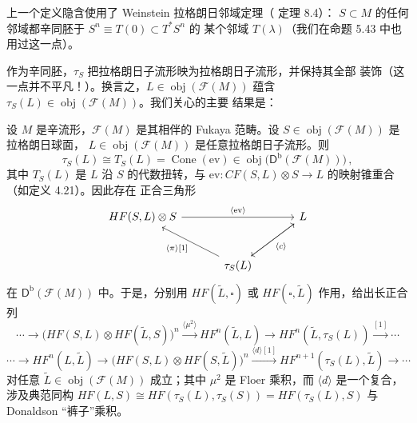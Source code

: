 
上一个定义隐含使用了 Weinstein 拉格朗日邻域定理（\cite{Sil12} 定理 8.4）：
$S\subset M$ 的任何邻域都辛同胚于 $S^n\equiv T(0)\subset T^*S^n$ 的
某个邻域 $T(\lambda)$（我们在命题 5.43 中也用过这一点）。

作为辛同胚，$\tau_S$ 把拉格朗日子流形映为拉格朗日子流形，并保持其全部
装饰（这一点并不平凡！）。换言之，$L\in\operatorname{obj}(\mathcal F(M))$
蕴含 $\tau_S(L)\in\operatorname{obj}(\mathcal F(M))$。我们关心的主要
结果是：

\begin{Thm}\label{thm:6.23}
设 $M$ 是辛流形，$\mathcal F(M)$ 是其相伴的 Fukaya 范畴。设
$S\in\operatorname{obj}(\mathcal F(M))$ 是拉格朗日球面，
$L\in\operatorname{obj}(\mathcal F(M))$ 是任意拉格朗日子流形。则
\begin{equation}
\tau_S(L)\cong T_S(L)=\operatorname{Cone}(\mathrm{ev})
\in\operatorname{obj}\bigl(\mathsf D^{\mathrm b}(\mathcal F(M))\bigr)\,,
\label{eq:6.92}
\end{equation}
其中 $T_S(L)$ 是 $L$ 沿 $S$ 的代数扭转，与
$\mathrm{ev}:CF(S,L)\otimes S\to L$ 的映射锥重合（如定义 4.21）。因此存在
正合三角形
\begin{equation}
\begin{tikzcd}[row sep=2.6em, column sep=3.4em]
HF(S,L)\otimes S \arrow[rr, "\langle \mathrm{ev}\rangle"] & & L \arrow[dl] \\
& \tau_S(L) \arrow[ul, "\langle\pi\rangle{[}1{]}"] \arrow[ur, "\langle c\rangle" swap] &
\end{tikzcd}
\label{eq:6.93}
\end{equation}
在 $\mathsf D^{\mathrm b}(\mathcal F(M))$ 中。于是，分别用
$HF(\tilde L,\square)$ 或 $HF(\square,\tilde L)$ 作用，给出长正合列
\[
\cdots\to\bigl(HF(S,L)\otimes HF(\tilde L,S)\bigr)^n
\xrightarrow{\langle\mu^2\rangle}HF^n(\tilde L,L)\to
HF^n(\tilde L,\tau_S(L))\xrightarrow{[1]}\cdots
\]
\[
\cdots\to HF^n(L,\tilde L)\to
\bigl(HF(S,L)\otimes HF(S,\tilde L)\bigr)^n
\xrightarrow{\langle d\rangle[1]}HF^{n+1}(\tau_S(L),\tilde L)\to\cdots
\]
对任意 $\tilde L\in\operatorname{obj}(\mathcal F(M))$ 成立；其中
$\mu^2$ 是 Floer 乘积，而 $\langle d\rangle$ 是一个复合，涉及典范同构
$HF(L,S)\cong HF(\tau_S(L),\tau_S(S))=HF(\tau_S(L),S)$ 与 Donaldson
“裤子”乘积。
\end{Thm}

